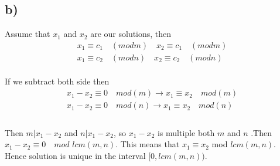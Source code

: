 \documentclass[12pt]{article}
\begin{document}
\subsection*{b)}
Assume that $x_1$ and $x_2$ are our solutions, then 
\begin{equation} 
\label{eq7}
\begin{split}
    x_1 \equiv c_1 \quad (mod m)\quad x_2 \equiv c_1\quad (mod m) \\
    x_1 \equiv c_2 \quad(mod n) \quad x_2 \equiv c_2 \quad(mod n)
\end{split}
\end{equation}\\
If we subtract both side then 
\begin{equation} 
\label{eq7}
\begin{split}
    x_1-x_2 \equiv 0 \quad mod(m) \to x_1 \equiv x_2 \quad mod(m) \\
    x_1-x_2 \equiv 0 \quad mod(n) \to x_1 \equiv x_2 \quad mod(n) \\
\end{split}
\end{equation}\\
Then $m|x_1-x_2$ and $n|x_1-x_2$, so $x_1 - x_2$ is multiple both $m$ and $n$ .Then $x_1 - x_2 \equiv 0 \quad mod$ $ lcm(m,n)$. This means that $x_1 \equiv x_2$ mod $lcm(m,n)$. Hence solution is unique in the interval $[0,lcm(m,n)) $.
\end{document}
